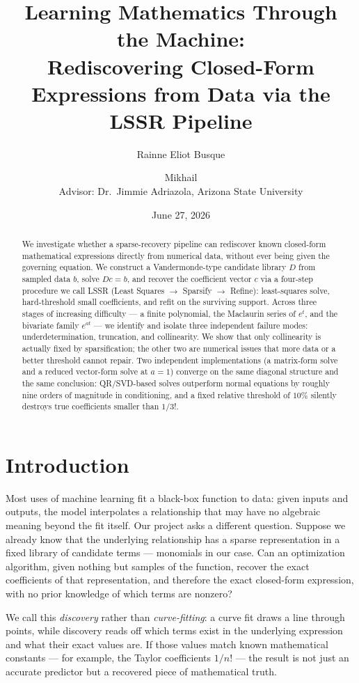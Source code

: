 \documentclass[11pt]{article}
\title{Learning Mathematics Through the Machine: \\
Rediscovering Closed-Form Expressions from Data via the LSSR Pipeline}
\author{Rainne Eliot Busque \and Mikhail \\
\small Advisor: Dr.\ Jimmie Adriazola, Arizona State University}
\date{June 27, 2026}
\begin{document}
\maketitle

\begin{abstract}
We investigate whether a sparse-recovery pipeline can rediscover known closed-form
mathematical expressions directly from numerical data, without ever being given the
governing equation. We construct a Vandermonde-type candidate library $D$ from sampled
data $b$, solve $Dc = b$, and recover the coefficient vector $c$ via a four-step
procedure we call LSSR (Least Squares $\to$ Sparsify $\to$ Refine): least-squares solve,
hard-threshold small coefficients, and refit on the surviving support. Across three
stages of increasing difficulty --- a finite polynomial, the Maclaurin series of $e^{t}$,
and the bivariate family $e^{at}$ --- we identify and isolate three independent failure
modes: underdetermination, truncation, and collinearity. We show that only collinearity
is actually fixed by sparsification; the other two are numerical issues that more data
or a better threshold cannot repair. Two independent implementations (a matrix-form
solve and a reduced vector-form solve at $a=1$) converge on the same diagonal structure
and the same conclusion: QR/SVD-based solves outperform normal equations by roughly nine
orders of magnitude in conditioning, and a fixed relative threshold of $10\%$ silently
destroys true coefficients smaller than $1/3!$.
\end{abstract}

\section{Introduction}

Most uses of machine learning fit a black-box function to data: given inputs and
outputs, the model interpolates a relationship that may have no algebraic meaning beyond
the fit itself. Our project asks a different question. Suppose we already know that the
underlying relationship has a sparse representation in a fixed library of candidate
terms --- monomials in our case. Can an optimization algorithm, given nothing but
samples of the function, recover the exact coefficients of that representation, and
therefore the exact closed-form expression, with no prior knowledge of which terms are
nonzero?

We call this \emph{discovery} rather than \emph{curve-fitting}: a curve fit draws a line
through points, while discovery reads off which terms exist in the underlying expression
and what their exact values are. If those values match known mathematical constants ---
for example, the Taylor coefficients $1/n!$ --- the result is not just an accurate
predictor but a recovered piece of mathematical truth.
\end{document}

